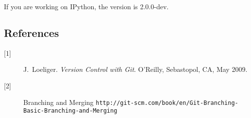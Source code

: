\documentclass[letterpaper]{article}
\begin{document}
If you are working on IPython, the version is 2.0.0-dev.

\subsection*{References}

\begin{description} 
\item[{[1]}] J.~Loeliger. {\em Version Control with Git}. O'Reilly, Sebastopol, CA, May 2009.
\item[{[2]}] Branching and Merging {\tt http://git-scm.com/book/en/Git-Branching-Basic-Branching-and-Merging}
\end{description}
\end{document}
